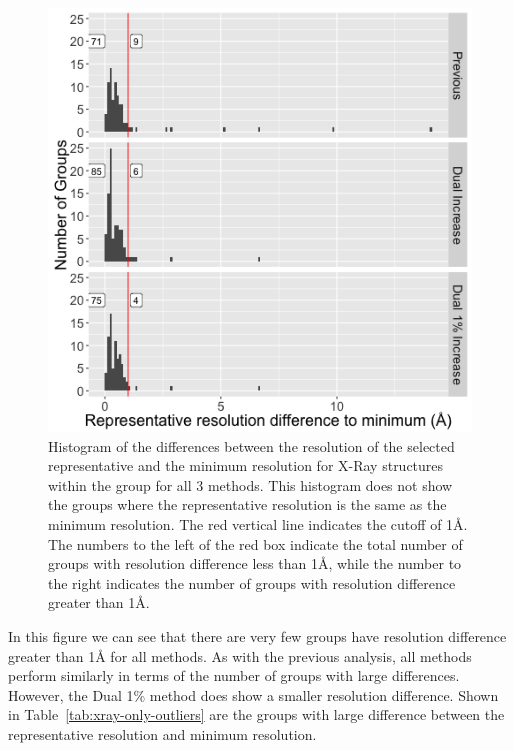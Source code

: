 \begin{figure}
  \includegraphics[width=0.5\linewidth]{chapter-4/figs/xray-res-diff}
  \caption{Histogram of the differences between the resolution of the selected
    representative and the minimum resolution for X-Ray structures within the
    group for all 3 methods. This histogram does not show the groups where the
    representative resolution is the same as the minimum resolution.  The red
    vertical line indicates the cutoff of 1{\AA}. The numbers to the left of the
    red box indicate the total number of groups with resolution difference less
    than 1{\AA}, while the number to the right indicates the number of groups
    with resolution
  difference greater than 1{\AA}.}
\label{fig:xray-only-diff}
\end{figure}

In this figure we can see that there are very few groups have resolution
difference greater than 1\AA{} for all methods. As with the previous analysis, all
methods perform similarly in terms of the number of groups with large
differences. However, the Dual 1\% method does show a smaller resolution
difference. Shown in Table~\ref{tab:xray-only-outliers} are the groups with large
difference between the representative resolution and minimum resolution.

